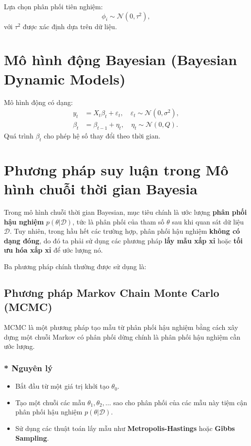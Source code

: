 Lựa chọn phân phối tiên nghiệm:
\begin{equation}
    \phi_i \sim \mathcal{N}(0, \tau^2),
\end{equation}
với \(\tau^2\) được xác định dựa trên dữ liệu.

\section{Mô hình động Bayesian (Bayesian Dynamic Models)}
Mô hình động có dạng:
\begin{align}
    y_t &= X_t \beta_t + \varepsilon_t, \quad \varepsilon_t \sim \mathcal{N}(0, \sigma^2), \\
    \beta_t &= \beta_{t-1} + \eta_t, \quad \eta_t \sim \mathcal{N}(0, Q).
\end{align}
Quá trình \(\beta_t\) cho phép hệ số thay đổi theo thời gian.

\section{Phương pháp suy luận trong Mô hình chuỗi thời gian Bayesia}
Trong mô hình chuỗi thời gian Bayesian, mục tiêu chính là ước lượng \textbf{phân phối hậu nghiệm} $p(\theta | \mathcal{D})$, tức là phân phối của tham số $\theta$ sau khi quan sát dữ liệu $\mathcal{D}$. Tuy nhiên, trong hầu hết các trường hợp, phân phối hậu nghiệm \textbf{không có dạng đóng}, do đó ta phải sử dụng các phương pháp \textbf{lấy mẫu xấp xỉ} hoặc \textbf{tối ưu hóa xấp xỉ} để ước lượng nó.

Ba phương pháp chính thường được sử dụng là:

\subsection{Phương pháp Markov Chain Monte Carlo (MCMC)}
MCMC là một phương pháp tạo mẫu từ phân phối hậu nghiệm bằng cách xây dựng một chuỗi Markov có phân phối dừng chính là phân phối hậu nghiệm cần ước lượng.

\subsubsection{* Nguyên lý}  
\begin{itemize}
    \item Bắt đầu từ một giá trị khởi tạo $\theta_0$.
    \item Tạo một chuỗi các mẫu $\theta_1, \theta_2, \dots$ sao cho phân phối của các mẫu này tiệm cận phân phối hậu nghiệm $p(\theta | \mathcal{D})$.
    \item Sử dụng các thuật toán lấy mẫu như \textbf{Metropolis-Hastings} hoặc \textbf{Gibbs Sampling}.
\end{itemize}

